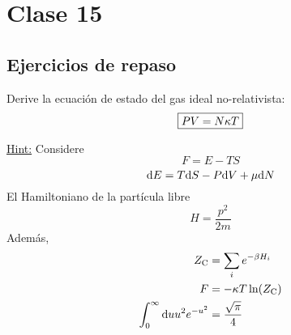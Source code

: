 \section{Clase 15}
\subsection{Ejercicios de repaso}
\begin{ej}
	Derive la ecuación de estado del gas ideal no-relativista:
	\begin{equation}
\boxed{  PV=N\kappa T}
\end{equation}

\underline{Hint:} Considere
\begin{equation}
  F=E-TS
\end{equation}
\begin{equation}
  \dd E=T\dd S-P\dd V+\mu\dd N
\end{equation}
El Hamiltoniano de la partícula libre
\begin{equation}
  H=\frac{p^2}{2m}
\end{equation}
Además,
\begin{align}
  Z_{\rm C}&=\sum_i e^{-\beta H_i}\\
  F&=-\kappa T\ln(Z_{\rm C})\\
  \int_0^{\infty}\dd uu^2e^{-u^2}&=\frac{\sqrt{\pi }}{4}
\end{align}
\end{ej}


